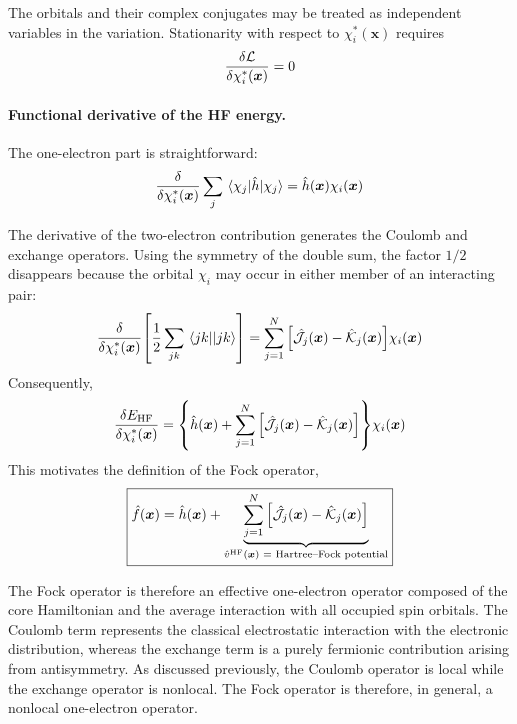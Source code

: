 \documentclass[11pt,a4paper,titlepage]{article}
\numberwithin{equation}{section}
\newcommand{\bx}{\boldsymbol{x}}
\newcommand{\hh}{\Hat{h}}
\newcommand{\hf}{\Hat{f}}
\newcommand{\chJ}{\Hat{\mathcal{J}}}
\newcommand{\chK}{\Hat{\mathcal{K}}}
\begin{document}
The orbitals and their complex conjugates may be treated as independent
variables in the variation. Stationarity with respect to
$\chi_i^*(\bx)$ requires
\begin{equation}
  \fdv{\mathcal{L}}{\chi_i^*(\bx)}
  =
  0
  \label{eq:hf-stationarity}
\end{equation}

\paragraph{Functional derivative of the HF energy.}

The one-electron part is straightforward:
\begin{equation}
  \fdv{}{\chi_i^*(\bx)}
  \sum_j
  \mel{\chi_j}{\hh}{\chi_j}
  =
  \hh(\bx)\chi_i(\bx)
\end{equation}

The derivative of the two-electron contribution generates the Coulomb and
exchange operators. Using the symmetry of the double sum, the factor
$1/2$ disappears because the orbital $\chi_i$ may occur in either member
of an interacting pair:
\begin{equation}
  \fdv{}{\chi_i^*(\bx)}
  \qty[
    \frac{1}{2}
    \sum_{jk}
    \mel{jk}{}{jk}
  ]
  =
  \sum_{j=1}^{N}
  \qty[
    \chJ_j(\bx)
    -
    \chK_j(\bx)
  ]
  \chi_i(\bx)
\end{equation}
Consequently,
\begin{equation}
  \fdv{E_\text{HF}}{\chi_i^*(\bx)}
  =
  \qty{
    \hh(\bx)
    +
    \sum_{j=1}^{N}
    \qty[
      \chJ_j(\bx)-\chK_j(\bx)
    ]
  }
  \chi_i(\bx)
\end{equation}
This motivates the definition of the Fock operator,
\begin{equation}
  \boxed{
  \hf(\bx)
  =
  \hh(\bx)
  +
  \underbrace{
    \sum_{j=1}^{N}
    \qty[
      \chJ_j(\bx)-\chK_j(\bx)
    ]
  }_{
    \Hat{v}^{\text{HF}}(\bx)
    \text{ = Hartree--Fock potential}
  }
  }
  \label{eq:fock-operator}
\end{equation}

The Fock operator is therefore an effective one-electron operator composed
of the core Hamiltonian and the average interaction with all occupied spin
orbitals. The Coulomb term represents the classical electrostatic
interaction with the electronic distribution, whereas the exchange term is
a purely fermionic contribution arising from antisymmetry.
As discussed previously, the Coulomb operator is local while the exchange
operator is nonlocal. The Fock operator is therefore, in general, a
nonlocal one-electron operator.
\end{document}
